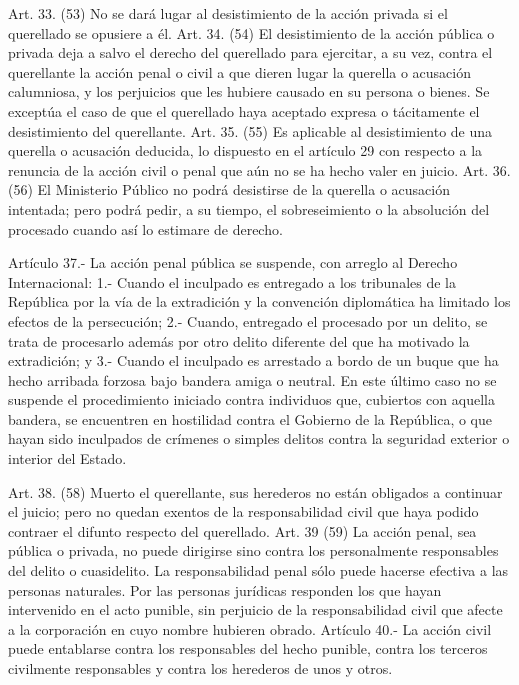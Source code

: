     Art. 33. (53) No se dará lugar al desistimiento de la acción privada si el querellado se opusiere a él.
    Art. 34. (54) El desistimiento de la acción pública o privada deja a salvo el derecho del querellado para ejercitar, a su vez, contra el querellante la acción penal o civil a que dieren lugar la querella o acusación calumniosa, y los perjuicios que les hubiere causado en su persona o bienes.
    Se exceptúa el caso de que el querellado haya aceptado expresa o tácitamente el desistimiento del querellante.
    Art. 35. (55) Es aplicable al desistimiento de una querella o acusación deducida, lo dispuesto en el artículo 29 con respecto a la renuncia de la acción civil o penal que aún no se ha hecho valer en juicio.
    Art. 36. (56) El Ministerio Público no podrá desistirse de la querella o acusación intentada; pero podrá pedir, a su tiempo, el sobreseimiento o la absolución del procesado cuando así lo estimare de derecho.




    Artículo 37.- La acción penal pública se suspende, con arreglo al Derecho Internacional:
    1.- Cuando el inculpado es entregado a los tribunales de la República por la vía de la extradición y la convención diplomática ha limitado los efectos de la persecución;
    2.- Cuando, entregado el procesado por un delito, se trata de procesarlo además por otro delito diferente del que ha motivado la extradición; y
    3.- Cuando el inculpado es arrestado a bordo de un buque que ha hecho arribada forzosa bajo bandera amiga o neutral.
    En este último caso no se suspende el procedimiento iniciado contra individuos que, cubiertos con aquella bandera, se encuentren en hostilidad contra el Gobierno de la República, o que hayan sido inculpados de crímenes o simples delitos contra la seguridad exterior o interior del Estado.

    Art. 38. (58) Muerto el querellante, sus herederos no están obligados a continuar el juicio; pero no quedan exentos de la responsabilidad civil que haya podido contraer el difunto respecto del querellado.
    Art. 39 (59) La acción penal, sea pública o privada, no puede dirigirse sino contra los personalmente responsables del delito o cuasidelito.
    La responsabilidad penal sólo puede hacerse efectiva a las personas naturales. Por las personas jurídicas responden los que hayan intervenido en el acto punible, sin perjuicio de la responsabilidad civil que afecte a la corporación en cuyo nombre hubieren obrado.
    Artículo 40.- La acción civil puede entablarse contra los responsables del hecho punible, contra los terceros civilmente responsables y contra los herederos de unos y otros.

